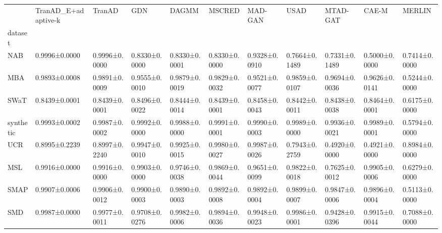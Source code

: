 \begin{tabular}{lllllllllll}
\toprule
 & TranAD_E+adaptive-k & TranAD & GDN & DAGMM & MSCRED & MAD-GAN & USAD & MTAD-GAT & CAE-M & MERLIN \\
dataset &  &  &  &  &  &  &  &  &  &  \\
\midrule
NAB & 0.9996±0.0000 & 0.9996±0.0000 & 0.8330±0.0000 & 0.8330±0.0001 & 0.8330±0.0000 & 0.9328±0.0910 & 0.7664±0.1489 & 0.7331±0.1489 & 0.5000±0.0000 & 0.7414±0.0000 \\
MBA & 0.9893±0.0008 & 0.9891±0.0009 & 0.9555±0.0010 & 0.9879±0.0019 & 0.9829±0.0032 & 0.9521±0.0077 & 0.9859±0.0107 & 0.9694±0.0036 & 0.9626±0.0141 & 0.5244±0.0000 \\
SWaT & 0.8439±0.0001 & 0.8439±0.0001 & 0.8496±0.0022 & 0.8444±0.0014 & 0.8439±0.0001 & 0.8458±0.0043 & 0.8442±0.0011 & 0.8438±0.0038 & 0.8464±0.0001 & 0.6175±0.0000 \\
synthetic & 0.9993±0.0002 & 0.9987±0.0002 & 0.9992±0.0000 & 0.9988±0.0000 & 0.9991±0.0001 & 0.9990±0.0003 & 0.9989±0.0000 & 0.9936±0.0021 & 0.9989±0.0001 & 0.5794±0.0000 \\
UCR & 0.8995±0.2239 & 0.8997±0.2240 & 0.9947±0.0010 & 0.9925±0.0015 & 0.9980±0.0027 & 0.9987±0.0026 & 0.7943±0.2759 & 0.4920±0.0000 & 0.4921±0.0000 & 0.8984±0.0000 \\
MSL & 0.9916±0.0000 & 0.9916±0.0000 & 0.9903±0.0000 & 0.9746±0.0038 & 0.9869±0.0044 & 0.9651±0.0099 & 0.9822±0.0018 & 0.7625±0.0012 & 0.9905±0.0006 & 0.6279±0.0000 \\
SMAP & 0.9907±0.0006 & 0.9906±0.0012 & 0.9900±0.0003 & 0.9890±0.0003 & 0.9892±0.0008 & 0.9892±0.0004 & 0.9899±0.0007 & 0.9847±0.0006 & 0.9896±0.0004 & 0.5113±0.0000 \\
SMD & 0.9987±0.0000 & 0.9977±0.0011 & 0.9708±0.0276 & 0.9982±0.0006 & 0.9894±0.0036 & 0.9948±0.0023 & 0.9986±0.0001 & 0.9428±0.0396 & 0.9915±0.0044 & 0.7088±0.0000 \\
\bottomrule
\end{tabular}

